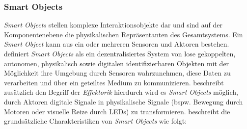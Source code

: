 \subsubsection{Smart Objects}
\textit{Smart Objects} stellen komplexe Interaktionsobjekte dar und sind auf der Komponentenebene die physikalischen Repräsentanten des Gesamtsystems. Ein \textit{Smart Object} kann aus ein oder mehreren Sensoren und Aktoren bestehen. \cite{Kortuem2010Smart} definiert \textit{Smart Objects} als ein dezentralisiertes System von lose gekoppelten, autonomen, physikalisch sowie digitalen identifizierbaren Objekten mit der Möglichkeit ihre Umgebung durch Sensoren wahrzunehmen, diese Daten zu verarbeiten und über ein geteiltes Medium zu kommunizieren. \cite{mattern2010internet} beschreibt zusätzlich den Begriff der \textit{Effektorik} hierdurch wird es \textit{Smart Objects} möglich, durch Aktoren digitale Signale in  physikalische Signale (bspw. Bewegung durch Motoren oder visuelle Reize durch LEDs) zu transformieren. \cite{Kortuem2010Smart} beschreibt die grundsätzliche Charakteristiken von \textit{Smart Objects} wie folgt:
